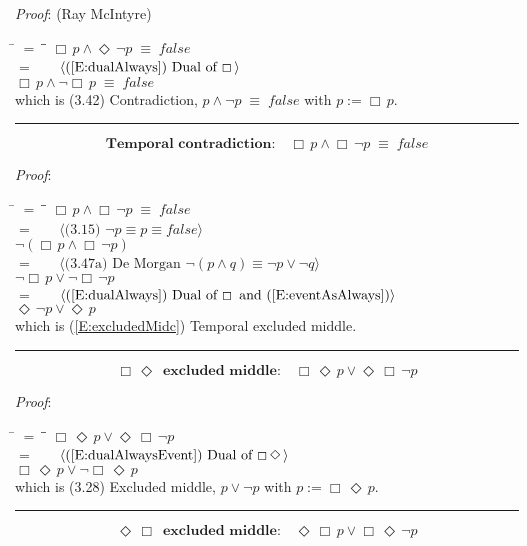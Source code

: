 \documentclass[12pt, fleqn, leqno]{article}
\newcommand{\lgap}{2pt}                             %
\newcommand{\mymathindent}{24pt}                    %
\newcommand{\equivs}{\ensuremath{\;\equiv\;}}       %
\newcommand{\Event}{\Diamond\,}
\newcommand{\Always}{\Box\,}
\newcommand{\myqed}{\rule[-.23ex]{1.2ex}{2.0ex}}
\newcommand{\myqedtab}{\hspace{384pt}}              %
\newcommand{\Gll} {\langle}                         %
\newcommand{\Ggg} {\rangle}                         %
\newcommand{\Hint}[1]     {\ \ \ $\Gll              \mbox{#1} \Ggg$ }   %
\begin{document}
\emph{Proof}: (Ray McIntyre)
\begin{tabbing}
\hspace{\mymathindent} \= $= \;$ \= \myqedtab \= \kill
  \> \>   $\Always p \land \Event\neg p \equivs false$\\[\lgap]
  \> $=$  \>  \Hint{(\ref{E:dualAlways}) Dual of $\Always$}\\[\lgap]
  \> \>   $\Always p \land \neg\Always p \equivs false$\\[\lgap]
  \> which is (3.42) Contradiction, $p\land\neg p \equivs false$ with $p := \Always p$. \quad \myqed
\end{tabbing}
\begin{equation}\label{E:contradictionc}
\textbf{Temporal contradiction:}\quad \Always p \land \Always \neg p \equivs false
\end{equation}

\emph{Proof}:
\begin{tabbing}
\hspace{\mymathindent} \= $= \;$ \= \myqedtab \= \kill
  \> \>   $\Always p \land \Always \neg p \equivs false$\\[\lgap]
  \> $=$  \>  \Hint{(3.15) $\neg p\equiv p\equiv false$}\\[\lgap]
  \> \>   $\neg(\Always p \land \Always \neg p)$\\[\lgap]
  \> $=$  \>  \Hint{(3.47a) De Morgan $\neg (p \land q) \equiv \neg p \lor \neg q$}\\[\lgap]
  \> \>   $\neg\Always p \lor \neg\Always \neg p$\\[\lgap]
  \> $=$  \>  \Hint{(\ref{E:dualAlways}) Dual of $\Always$ and (\ref{E:eventAsAlways})}\\[\lgap]
  \> \>   $\Event\neg p \lor \Event p$\\[\lgap]
  \> which is (\ref{E:excludedMidc}) Temporal excluded middle. \quad \myqed
\end{tabbing}
\begin{equation}\label{E:AEexcludedMid}
\textbf{$\Always \Event $ excluded middle:}\quad \Always \Event p \lor \Event \Always\neg p
\end{equation}

\emph{Proof}:
\begin{tabbing}
\hspace{\mymathindent} \= $= \;$ \= \myqedtab \= \kill
  \> \>   $\Always \Event p \lor \Event \Always\neg p$\\[\lgap]
  \> $=$  \>  \Hint{(\ref{E:dualAlwaysEvent}) Dual of $\Always \Event$}\\[\lgap]
  \> \>   $\Always \Event p \lor \neg \Always\Event p$\\[\lgap]
  \> which is (3.28) Excluded middle, $p\lor\neg p$ with $p := \Always \Event p$. \quad \myqed
\end{tabbing}
\begin{equation}\label{E:EAexcludedMid}
\textbf{$\Event \Always $ excluded middle:}\quad \Event \Always p \lor \Always \Event\neg p
\end{equation}
\end{document}
